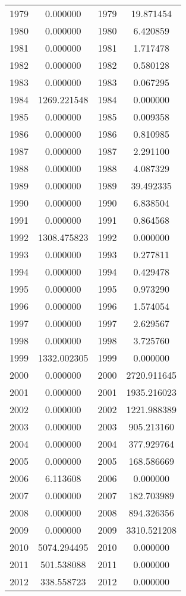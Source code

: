 \documentclass[12pt]{article}
\begin{document}
\begin{longtable}{@{}cccc@{}}
1979 & 0.000000 & 1979 & 19.871454 \\
1980 & 0.000000 & 1980 & 6.420859 \\
1981 & 0.000000 & 1981 & 1.717478 \\
1982 & 0.000000 & 1982 & 0.580128 \\
1983 & 0.000000 & 1983 & 0.067295 \\
1984 & 1269.221548 & 1984 & 0.000000 \\
1985 & 0.000000 & 1985 & 0.009358 \\
1986 & 0.000000 & 1986 & 0.810985 \\
1987 & 0.000000 & 1987 & 2.291100 \\
1988 & 0.000000 & 1988 & 4.087329 \\
1989 & 0.000000 & 1989 & 39.492335 \\
1990 & 0.000000 & 1990 & 6.838504 \\
1991 & 0.000000 & 1991 & 0.864568 \\
1992 & 1308.475823 & 1992 & 0.000000 \\
1993 & 0.000000 & 1993 & 0.277811 \\
1994 & 0.000000 & 1994 & 0.429478 \\
1995 & 0.000000 & 1995 & 0.973290 \\
1996 & 0.000000 & 1996 & 1.574054 \\
1997 & 0.000000 & 1997 & 2.629567 \\
1998 & 0.000000 & 1998 & 3.725760 \\
1999 & 1332.002305 & 1999 & 0.000000 \\
2000 & 0.000000 & 2000 & 2720.911645 \\
2001 & 0.000000 & 2001 & 1935.216023 \\
2002 & 0.000000 & 2002 & 1221.988389 \\
2003 & 0.000000 & 2003 & 905.213160 \\
2004 & 0.000000 & 2004 & 377.929764 \\
2005 & 0.000000 & 2005 & 168.586669 \\
2006 & 6.113608 & 2006 & 0.000000 \\
2007 & 0.000000 & 2007 & 182.703989 \\
2008 & 0.000000 & 2008 & 894.326356 \\
2009 & 0.000000 & 2009 & 3310.521208 \\
2010 & 5074.294495 & 2010 & 0.000000 \\
2011 & 501.538088 & 2011 & 0.000000 \\
2012 & 338.558723 & 2012 & 0.000000 \\

\end{longtable}
\end{document}
